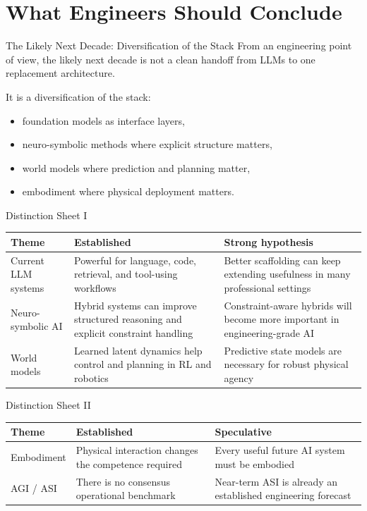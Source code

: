 \documentclass[12pt]{beamer}
\begin{document}
\section{What Engineers Should Conclude}

\begin{frame}{The Likely Next Decade: Diversification of the Stack}
  From an engineering point of view, the likely next decade is not a clean handoff from LLMs to one replacement architecture.

  It is a diversification of the stack:
  \begin{itemize}
    \item foundation models as interface layers,
    \item neuro-symbolic methods where explicit structure matters,
    \item world models where prediction and planning matter,
    \item embodiment where physical deployment matters.
  \end{itemize}
\end{frame}

\begin{frame}{Distinction Sheet I}
  \small
  \begin{tabular}{p{}p{}p{}}
    \toprule
    \textbf{Theme} & \textbf{Established} & \textbf{Strong hypothesis} \\
    \midrule
    Current LLM systems & Powerful for language, code, retrieval, and tool-using workflows & Better scaffolding can keep extending usefulness in many professional settings \\
    Neuro-symbolic AI & Hybrid systems can improve structured reasoning and explicit constraint handling & Constraint-aware hybrids will become more important in engineering-grade AI \\
    World models & Learned latent dynamics help control and planning in RL and robotics & Predictive state models are necessary for robust physical agency \\
    \bottomrule
  \end{tabular}
\end{frame}

\begin{frame}{Distinction Sheet II}
  \small
  \begin{tabular}{p{}p{}p{}}
    \toprule
    \textbf{Theme} & \textbf{Established} & \textbf{Speculative} \\
    \midrule
    Embodiment & Physical interaction changes the competence required & Every useful future AI system must be embodied \\
    AGI / ASI & There is no consensus operational benchmark & Near-term ASI is already an established engineering forecast \\
    \bottomrule
  \end{tabular}
\end{frame}
\end{document}
